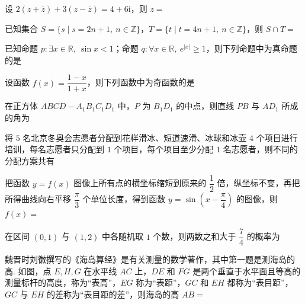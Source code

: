 \documentclass[a4paper,11pt]{report}
\begin{document}
\begin{examquestions}

\item 设 $2(z+\overline z)+3(z-\overline z)=4+6\mathrm{i}$，则 $z=$

\item 已知集合 $S=\{s\mid s=2n+1,\ n\in\mathbb Z\}$，$T=\{t\mid t=4n+1,\ n\in\mathbb Z\}$，则 $S\cap T=$

\item 已知命题 $p:\exists x\in\mathbb R,\ \sin x<1$；命题 $q:\forall x\in\mathbb R,\ e^{|x|}\geq1$，则下列命题中为真命题的是

\item 设函数 $f(x)=\dfrac{1-x}{1+x}$，则下列函数中为奇函数的是

\item 在正方体 $ABCD-A_1B_1C_1D_1$ 中，$P$ 为 $B_1D_1$ 的中点，则直线 $PB$ 与 $AD_1$ 所成的角为

\item 将 $5$ 名北京冬奥会志愿者分配到花样滑冰、短道速滑、冰球和冰壶 $4$ 个项目进行培训，每名志愿者只分配到 $1$ 个项目，每个项目至少分配 $1$ 名志愿者，则不同的分配方案共有
\newpage
\item 把函数 $y=f(x)$ 图像上所有点的横坐标缩短到原来的 $\dfrac12$ 倍，纵坐标不变，再把所得曲线向右平移 $\dfrac{\pi}{3}$ 个单位长度，得到函数 $y=\sin\left(x-\dfrac{\pi}{4}\right)$ 的图像，则 $f(x)=$
\fourchoices
{}
{}
{}
{}

\item 在区间 $(0,1)$ 与 $(1,2)$ 中各随机取 $1$ 个数，则两数之和大于 $\dfrac74$ 的概率为

\item 魏晋时刘徽撰写的《海岛算经》是有关测量的数学著作，其中第一题是测海岛的高. 如图，点 $E,H,G$ 在水平线 $AC$ 上，$DE$ 和 $FG$ 是两个垂直于水平面且等高的测量标杆的高度，称为“表高”，$EG$ 称为“表距”，$GC$ 和 $EH$ 都称为“表目距”，$GC$ 与 $EH$ 的差称为“表目距的差”，则海岛的高 $AB=$


\end{examquestions}
\end{document}
